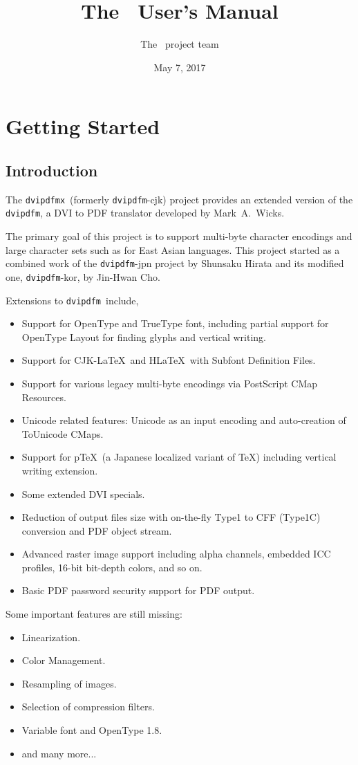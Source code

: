 \documentclass[a4paper,xetex,oneside]{book}
\title{The \dvipdfmx\ User's Manual}
\author{The \dvipdfmx\ project team}
\date{May 7, 2017}
\newcommand{\dvipdfm}{\texttt{dvipdfm}}
\newcommand{\dvipdfmx}{\texttt{dvipdfmx}}
\begin{document}
\maketitle
\tableofcontents

\chapter{Getting Started}

\section{Introduction}

The \dvipdfmx\ (formerly \dvipdfm-cjk) project provides an extended version of
the \dvipdfm, a DVI to PDF translator developed by Mark~A.~Wicks.

The primary goal of this project is to support multi-byte character encodings
and large character sets such as for East Asian languages.
This project started as a combined work of the \dvipdfm-jpn project by
Shunsaku Hirata and its modified one, \dvipdfm-kor, by Jin-Hwan Cho.

Extensions to \dvipdfm\ include,
\begin{itemize}
    \item Support for OpenType and TrueType font, including partial support
    for OpenType Layout for finding glyphs and vertical writing.
    \item Support for CJK-\LaTeX\ and H\LaTeX\ with Subfont Definition Files.
    \item Support for various legacy multi-byte encodings via PostScript CMap
     Resources.
    \item Unicode related features: Unicode as an input encoding and
    auto-creation of ToUnicode CMaps.
    \item Support for p\TeX\ (a Japanese localized variant of \TeX) including
    vertical writing extension.
    \item Some extended DVI specials.
    \item Reduction of output files size with on-the-fly Type1 to CFF (Type1C)
    conversion and PDF object stream.
    \item Advanced raster image support including alpha channels, embedded
    ICC profiles, 16-bit bit-depth colors, and so on.
    \item Basic PDF password security support for PDF output.
\end{itemize}
Some important features are still missing:
\begin{itemize}
    \item Linearization.
    \item Color Management.
    \item Resampling of images.
    \item Selection of compression filters.
    \item Variable font and OpenType 1.8.
    \item and many more...
\end{itemize}
\end{document}
